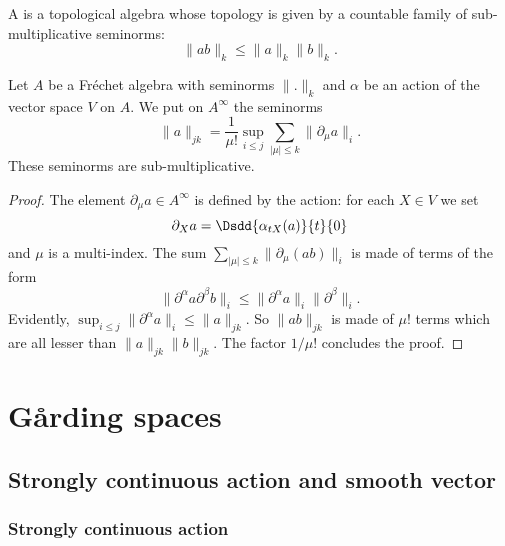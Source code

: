 \begin{definition}
A  is a topological algebra whose topology is given by a countable family of sub-multiplicative seminorms:
\[ 
  \| ab \|_k\leq \| a \|_k\| b \|_k.
\]

\end{definition}

\begin{proposition}
Let $A$ be a Fréchet algebra with seminorms $\| . \|_k$ and $\alpha$ be an action of the vector space $V$ on $A$. We put on $A^{\infty}$ the seminorms
\begin{equation}
  \| a \|_{jk}=\frac{1}{ \mu! }\sup_{i\leq j}\sum_{| \mu |\leq k}\| \partial_{\mu}a \|_i.
\end{equation}
These seminorms are sub-multiplicative.

\end{proposition}

\begin{proof}
The element $\partial_{\mu}a\in A^{\infty}$ is defined by the action: for each $X\in V$ we set
\[ 
  \partial_X a=\Dsdd{ \alpha_{tX}(a) }{t}{0}
\]
and $\mu$ is a multi-index. The sum $\sum_{| \mu |\leq k}\| \partial_{\mu}(ab) \|_{i}$ is made of terms of the form
\[ 
  \| \partial^{\alpha}a\partial^{\beta}b \|_i\leq\| \partial^{\alpha}a \|_i\| \partial^{\beta} \|_i.
\]
Evidently, $\sup_{i\leq j}\| \partial^{\alpha}a \|_i\leq \| a \|_{jk}$. So $\| ab \|_{jk}$ is made of $\mu !$ terms which are all lesser than $\| a \|_{jk}\| b \|_{jk}$. The factor $1/\mu!$ concludes the proof.

\end{proof}
%
   \section{G\r arding spaces}
%

\subsection{Strongly continuous action and smooth vector}  \label{subsec:actionrn}

\subsubsection{Strongly continuous action}

